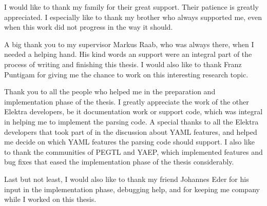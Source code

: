 \begin{acknowledgements*}
I would like to thank my family for their great support. Their patience is greatly appreciated. I especially like to thank my brother who always supported me, even when this work did not progress in the way it should.

A big thank you to my supervisor Markus Raab, who was always there, when I needed a helping hand. His kind words an support were an integral part of the process of writing and finishing this thesis. I would also like to thank Franz Puntigam for giving me the chance to work on this interesting research topic.

Thank you to all the people who helped me in the preparation and implementation phase of the thesis. I greatly appreciate the work of the other Elektra developers, be it documentation work or support code, which was integral in helping me to implement the parsing code. A special thanks to all the Elektra developers that took part of in the discussion about YAML features, and helped me decide on which YAML features the parsing code should support. I also like to thank the communities of \gls{PEGTL} and \gls{YAEP}, which implemented features and bug fixes that eased the implementation phase of the thesis considerably.

Last but not least, I would also like to thank my friend Johannes Eder for his input in the implementation phase, debugging help, and for keeping me company while I worked on this thesis.
\end{acknowledgements*}

